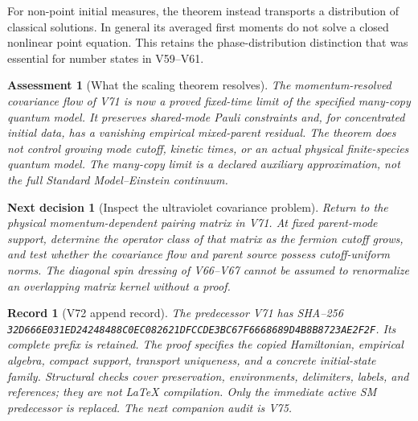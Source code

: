 \documentclass[11pt]{article}
\newtheorem{decision}[theorem]{Next decision}
\newtheorem{assessment}[theorem]{Assessment}
\newtheorem{record}[theorem]{Record}
\theoremstyle{remark}
\begin{document}
For non-point initial measures, the theorem instead
transports a distribution of classical solutions.
In general its averaged first moments do not
solve a closed nonlinear point equation.  This
retains the phase-distribution distinction that
was essential for number states in V59--V61.

\begin{assessment}[What the scaling theorem resolves]
\label{ass:v20v72}
The momentum-resolved covariance flow of V71 is
now a proved fixed-time limit of the specified
many-copy quantum model.  It preserves shared-mode
Pauli constraints and, for concentrated initial
data, has a vanishing empirical mixed-parent
residual.  The theorem does not control growing
mode cutoff, kinetic times, or an actual physical
finite-species quantum model.  The many-copy
limit is a declared auxiliary approximation,
not the full Standard Model--Einstein continuum.
\end{assessment}

\begin{decision}[Inspect the ultraviolet covariance problem]
\label{dec:v20v72-next}
Return to the physical momentum-dependent pairing
matrix in V71.  At fixed parent-mode support,
determine the operator class of that matrix
as the fermion cutoff grows, and test whether
the covariance flow and parent source possess
cutoff-uniform norms.  The diagonal spin dressing
of V66--V67 cannot be assumed to renormalize an
overlapping matrix kernel without a proof.
\end{decision}

\begin{record}[V72 append record]
\label{rec:v20v72}
The predecessor V71 has SHA--256
\texttt{32D666E031ED24248488C0EC082621DFCCDE3BC67F6668689D4B8B8723AE2F2F}.
Its complete prefix is retained.  The proof
specifies the copied Hamiltonian, empirical
algebra, compact support, transport uniqueness,
and a concrete initial-state family.
Structural checks cover preservation,
environments, delimiters, labels, and references;
they are not LaTeX compilation.
Only the immediate active SM predecessor is
replaced.  The next companion audit is V75.
\end{record}
\end{document}
